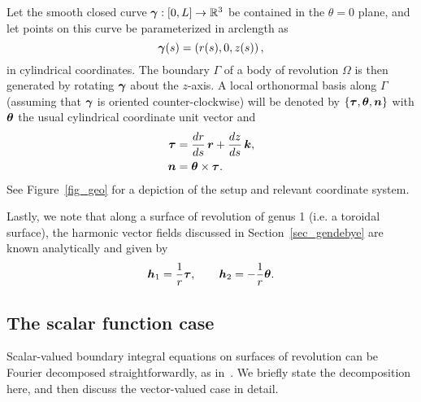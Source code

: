 \documentclass[11pt]{article}
\newcommand{\vct}{\vectorsym}
\newcommand{\bbR}{\mathbb R}
\newcommand\khat{\vct{{k}}}
\newcommand\rhat{\vct{{r}}}
\newcommand\tauhat{\vct{{ \tau}}}
\newcommand\thetahat{{\vct{{\theta}}}}
\newcommand\nhat{\vct{ {n}}}
\newcommand\bh{\vct{h}}
\numberwithin{equation}{section}
\begin{document}
Let the smooth closed curve $\vct{\gamma}: [0,L] \to \bbR^3$ be contained in
the $\theta=0$ plane, and let points on this curve be parameterized in
arclength as
\begin{equation}
  \vct{\gamma}(s) = \left( r(s), 0, z(s) \right),
\end{equation}
in cylindrical coordinates.  The boundary $\Gamma$
of a body of revolution $\Omega$ is then generated by rotating
$\vct{\gamma}$ about the $z$-axis.   A local
orthonormal basis along $\Gamma$ (assuming that $\vct{\gamma}$ is
oriented counter-clockwise) will be denoted by
$\{\tauhat, \thetahat, \nhat\}$ with $\thetahat$ the usual cylindrical
coordinate unit vector and
\begin{equation}
  \begin{aligned}
    \tauhat &= \frac{dr}{ds} \, \rhat + \frac{dz}{ds} \, \khat, \\
    \nhat &= \thetahat \times \tauhat .
  \end{aligned}
\end{equation}
See Figure~\ref{fig_geo} for a depiction of the setup and relevant
coordinate system. 

Lastly, we note that along a surface of revolution of genus 1
(i.e. a toroidal surface), 
the harmonic vector fields discussed in Section~\ref{sec_gendebye} are known
analytically and given by
\begin{equation} \label{hvecsformula}
\bh_1 = \frac{1}{r} \tauhat , \qquad \bh_2 = -\frac{1}{r} \thetahat.
\end{equation}




\subsection{The scalar function case}
\label{sec_scalar}

Scalar-valued boundary integral equations on surfaces of revolution
can be Fourier decomposed straightforwardly,
as in~\cite{young,helsing_2014}.  We
briefly state the decomposition here, and then discuss the
vector-valued case in detail.
\end{document}
